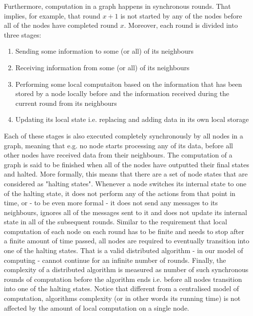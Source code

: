 Furthermore, computation in a graph happens in synchronous rounds. That implies,
for example, that round $x+1$ is not started by any of the nodes before all of the
nodes have completed round $x$. Moreover, each round is divided into three stages:

\begin{enumerate}
\item Sending some information to some (or all) of its neighbours

\item Receiving information
from some (or all) of its neighbours

\item Performing some local computaiton based
on the information that has been stored by a node locally before and the information
received during the current round from its neighbours

\item Updating its local state i.e. replacing and adding data in its own local storage
\end{enumerate}

Each of these stages is also executed
completely synchronously by all nodes in a graph, meaning that e.g. no node starts processing
any of its data, before all other nodes have received data from their neighbours. The computation
of a graph is said to be finished when all of the nodes have outputted their final states
and halted. More formally, this means that there are a set of node states that are
considered as "halting states". Whenever a node switches its internal state to one of the 
halting state, it does not perform any of the actions from that point in time, or - to
be even more formal - it does not send any messages to its neighbours, ignores all of the 
messages sent to it and does not update its internal state in all of the subsequent rounds.
Similar to the requirement that local computation of each node on each round has to be finite
and needs to stop after a finite amount of time passed, all nodes are required to eventually
transition into one of the halting states. That is a valid distributed algorithm - in our model of
computing - cannot continue for an infinite number of rounds. Finally,
the complexity of a distributed algorithm is measured as number of such synchronous rounds
of computation before the algorithm ends i.e. before all nodes transition into one of 
the halting states. Notice that different from a centralised model of computation,
algorithms complexity (or in other words its running time) is not affected by the
amount of local computation on a single node.

